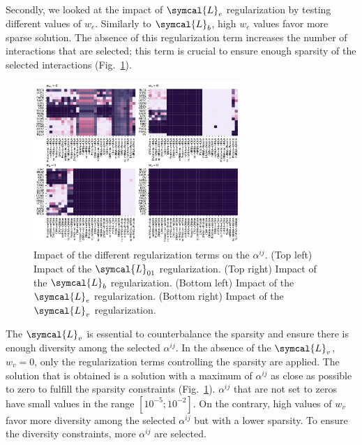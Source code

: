 \documentclass[../main.tex]{subfiles}
\begin{document}
     Secondly, we looked at the impact of \(\symcal{L}_e\) regularization by testing different values of \(w_e\).
     Similarly to \(\symcal{L}_b\), high \(w_e\) values favor more sparse solution.
     The absence of this regularization term increases the number of interactions that are selected; this term is crucial to ensure enough sparsity of the selected interactions (Fig.~\ref{fig:alphas_signature_ablation}).

     \begin{figure}
         \centering
         \includegraphics[width=0.7\textwidth]{ablation_heatmaps.pdf}
         \caption{Impact of the different regularization terms on the \(\alpha^{ij}\). (Top left) Impact of the \(\symcal{L}_{01}\) regularization. (Top right) Impact of the \(\symcal{L}_{b}\) regularization. (Bottom left) Impact of the \(\symcal{L}_{e}\) regularization. (Bottom right) Impact of the \(\symcal{L}_{v}\) regularization.}
         \label{fig:alphas_signature_ablation}
     \end{figure}

     The \(\symcal{L}_v\) is essential to counterbalance the sparsity and ensure there is enough diversity among the selected \(\alpha^{ij}\).
     In the absence of the \(\symcal{L}_v\), \(w_v = 0\), only the regularization terms controlling the sparsity are applied.
     The solution that is obtained is a solution with a maximum of \(\alpha^{ij}\)  as close as possible to zero to fulfill the sparsity constraints (Fig.~\ref{fig:alphas_signature_ablation}).
     \(\alpha^{ij}\) that are not set to zeros have small values in the range \(\left[10^{-5}; 10^{-2}\right]\).
     On the contrary, high values of \(w_v\) favor more diversity among the selected \(\alpha^{ij}\) but with a lower sparsity.
     To ensure the diversity constraints, more \(\alpha^{ij}\) are selected.
\end{document}
